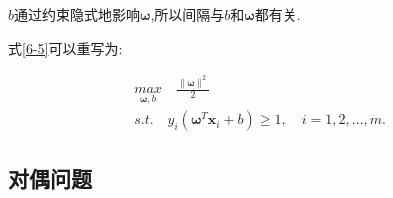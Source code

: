 \documentclass[12pt]{article}
\numberwithin{equation}{section}%
\begin{document}
$b$通过约束隐式地影响$\boldsymbol{\omega}$,所以间隔与$b$和$\boldsymbol{\omega}$都有关.

式\ref{6-5}可以重写为:

\begin{equation}
\begin{split}        %
 {\underset{\boldsymbol{\omega},b}{max}} \quad \frac{\parallel \boldsymbol{\omega} \parallel^{2}}{2} \\
 s.t. \quad y_{i}(\boldsymbol{\omega}^{T}\boldsymbol{x}_{i}+b) \geqslant 1, \quad i= 1,2, \ldots ,m.
\end{split}
\label{6-6}
\end{equation}

\subsection{对偶问题}





\end{document}
